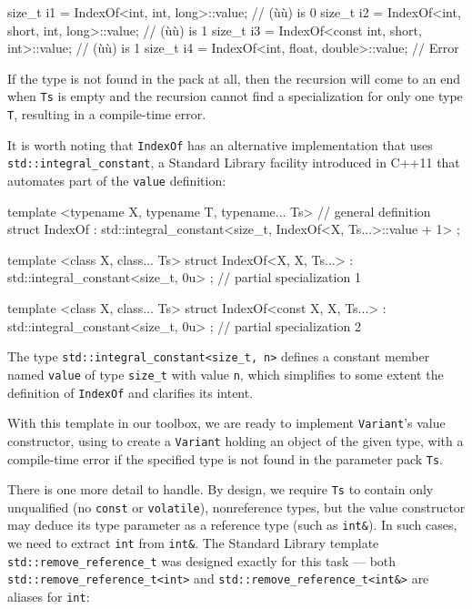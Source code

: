 \begin{emcppslisting}
size_t i1 = IndexOf<int, int, long>::value;         // (ù{}ù) is 0
size_t i2 = IndexOf<int, short, int, long>::value;  // (ù{}ù) is 1
size_t i3 = IndexOf<const int, short, int>::value;  // (ù{}ù) is 1
size_t i4 = IndexOf<int, float, double>::value;     // Error
\end{emcppslisting}
    

\noindent If the type is not found in the pack at all, then the recursion will
come to an end when \lstinline!Ts! is empty and the recursion cannot find a
specialization for only one type \lstinline!T!, resulting in a compile-time
error.

It is worth noting that \lstinline!IndexOf! has an alternative
implementation that uses\linebreak%
 \lstinline!std::integral_constant!, a Standard
Library facility introduced in C++11 that automates part of the
\lstinline!value! definition:

\begin{emcppslisting}
template <typename X, typename T, typename... Ts>  // general definition
struct IndexOf
    : std::integral_constant<size_t, IndexOf<X, Ts...>::value + 1> {};

template <class X, class... Ts>
struct IndexOf<X, X, Ts...>
    : std::integral_constant<size_t, 0u> {};       // partial specialization 1

template <class X, class... Ts>
struct IndexOf<const X, X, Ts...>
    : std::integral_constant<size_t, 0u> {};       // partial specialization 2
\end{emcppslisting}
    

\noindent The type \lstinline!std::integral_constant<size_t,!~\lstinline!n>! defines a
constant member named \lstinline!value! of type \lstinline!size_t! with value
\lstinline!n!, which simplifies to some extent the definition of
\lstinline!IndexOf! and clarifies its intent.

With this template in our toolbox, we are ready to implement
\lstinline!Variant!'s value constructor, using 
to create a \lstinline!Variant! holding an object of the given type, with a
compile-time error if the specified type is not found in the parameter
pack \lstinline!Ts!.

There is one more detail to handle. By design, we require \lstinline!Ts! to
contain only unqualified (no \lstinline!const! or \lstinline!volatile!),
nonreference types, but the value constructor may deduce its type
parameter as a reference type (such as \lstinline!int&!). In such cases,
we need to extract \lstinline!int! from \lstinline!int&!. The Standard
Library template \lstinline!std::remove_reference_t! was designed exactly
for this task --- both \lstinline!std::remove_reference_t<int>! and
\lstinline!std::remove_reference_t<int&>! are aliases for \lstinline!int!:

